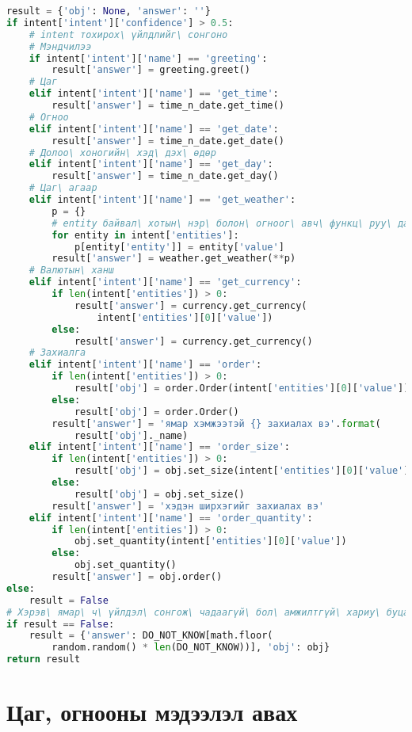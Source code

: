 \begin{lstlisting}[language=Python]
result = {'obj': None, 'answer': ''}
if intent['intent']['confidence'] > 0.5:
    # intent тохирох\ үйлдлийг\ сонгоно
    # Мэндчилээ
    if intent['intent']['name'] == 'greeting':
        result['answer'] = greeting.greet()
    # Цаг
    elif intent['intent']['name'] == 'get_time':
        result['answer'] = time_n_date.get_time()
    # Огноо
    elif intent['intent']['name'] == 'get_date':
        result['answer'] = time_n_date.get_date()
    # Долоо\ хоногийн\ хэд\ дэх\ өдөр
    elif intent['intent']['name'] == 'get_day':
        result['answer'] = time_n_date.get_day()
    # Цаг\ агаар
    elif intent['intent']['name'] == 'get_weather':
        p = {}
        # entity байвал\ хотын\ нэр\ болон\ огноог\ авч\ функц\ руу\ дамжуулна
        for entity in intent['entities']:
            p[entity['entity']] = entity['value']
        result['answer'] = weather.get_weather(**p)
    # Валютын\ ханш
    elif intent['intent']['name'] == 'get_currency':
        if len(intent['entities']) > 0:
            result['answer'] = currency.get_currency(
                intent['entities'][0]['value'])
        else:
            result['answer'] = currency.get_currency()
    # Захиалга
    elif intent['intent']['name'] == 'order':
        if len(intent['entities']) > 0:
            result['obj'] = order.Order(intent['entities'][0]['value'])
        else:
            result['obj'] = order.Order()
        result['answer'] = 'ямар хэмжээтэй {} захиалах вэ'.format(
            result['obj']._name)
    elif intent['intent']['name'] == 'order_size':
        if len(intent['entities']) > 0:
            result['obj'] = obj.set_size(intent['entities'][0]['value'])
        else:
            result['obj'] = obj.set_size()
        result['answer'] = 'хэдэн ширхэгийг захиалах вэ'
    elif intent['intent']['name'] == 'order_quantity':
        if len(intent['entities']) > 0:
            obj.set_quantity(intent['entities'][0]['value'])
        else:
            obj.set_quantity()
        result['answer'] = obj.order()
else:
    result = False
# Хэрэв\ ямар\ ч\ үйлдэл\ сонгож\ чадаагүй\ бол\ амжилтгүй\ хариу\ буцаана
if result == False:
    result = {'answer': DO_NOT_KNOW[math.floor(
        random.random() * len(DO_NOT_KNOW))], 'obj': obj}
return result
\end{lstlisting}

\chapter{Цаг, огнооны мэдээлэл авах}
\label{appendix:skill-datetime}

